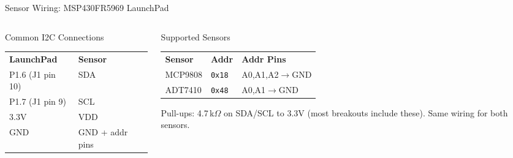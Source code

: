 \documentclass[aspectratio=169, 10pt]{beamer}
\begin{document}
\begin{frame}{Sensor Wiring: MSP430FR5969 LaunchPad}
\vspace{0.3em}
\begin{columns}[T]
\begin{column}{0.48\textwidth}
\begin{block}{Common I2C Connections}
\begin{tabular}{@{}ll@{}}
\textbf{LaunchPad} & \textbf{Sensor} \\
P1.6 (J1 pin 10) & SDA \\
P1.7 (J1 pin 9)  & SCL \\
3.3V              & VDD \\
GND               & GND + addr pins \\
\end{tabular}
\end{block}
\end{column}
\begin{column}{0.48\textwidth}
\begin{block}{Supported Sensors}
\scriptsize
\begin{tabular}{@{}lll@{}}
\textbf{Sensor} & \textbf{Addr} & \textbf{Addr Pins} \\
MCP9808 & \texttt{0x18} & A0,A1,A2$\to$GND \\
ADT7410 & \texttt{0x48} & A0,A1$\to$GND \\
\end{tabular}

\vspace{0.3em}
\normalsize
Pull-ups: 4.7\,k$\Omega$ on SDA/SCL to 3.3V
(most breakouts include these).
Same wiring for both sensors.
\end{block}
\end{column}
\end{columns}
\end{frame}
\end{document}
